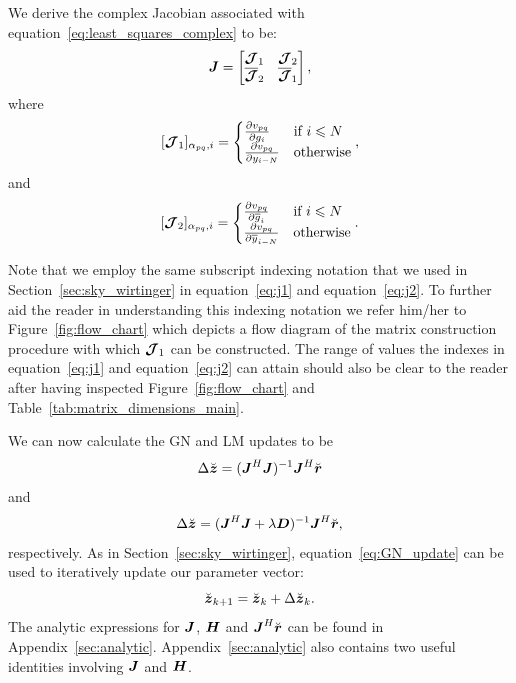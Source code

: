 \documentclass[useAMS,usenatbib]{mn2e}
\newcommand{\bz}{\bmath{z}}
\newcommand{\br}{\bmath{r}}
\newcommand{\bv}{\bmath{v}}
\newcommand{\bJ}{\bmath{J}}
\newcommand{\bD}{\bmath{D}}
\newcommand{\bH}{\bmath{H}}
\newcommand{\bmJ}{\bmath{\mathcal{J}}}
\newcommand{\conj}[1]{\overline{#1}}
\begin{document}
We derive the complex Jacobian associated with equation~\ref{eq:least_squares_complex} to be:
\begin{equation}
\label{eq:Jacobian}
\bJ = \begin{bmatrix}
       \bmJ_1 & \bmJ_2\\
       \conj{\bmJ}_2 & \conj{\bmJ}_1 
      \end{bmatrix},
\end{equation}
where 
\begin{equation}
\label{eq:j1}
[\bmJ_1]_{\alpha_{pq},i} = \begin{cases} 
     \frac{\partial v_{pq}}{\partial g_i} & \textrm{if}~i\leq N \\
     \frac{\partial v_{pq}}{\partial y_{i-N}} & \textrm{otherwise}  
\end{cases}, %
\end{equation}
and
\begin{equation}
\label{eq:j2}
[\bmJ_2]_{\alpha_{pq},i} = \begin{cases} 
     \frac{\partial v_{pq}}{\partial \conj{g}_i} & \textrm{if}~i\leq N \\
     \frac{\partial v_{pq}}{\partial \conj{y}_{i-N}} & \textrm{otherwise}  
\end{cases}. %
\end{equation}

Note that we employ the same subscript indexing notation that we used in Section~\ref{sec:sky_wirtinger} in equation~\ref{eq:j1} and equation~\ref{eq:j2}.
To further aid the reader in understanding this indexing notation we refer him/her to Figure~\ref{fig:flow_chart} which depicts a flow diagram of the matrix construction procedure 
with which $\bmJ_1$ can be constructed. The range of values the indexes in equation~\ref{eq:j1} and equation~\ref{eq:j2} can attain should also 
be clear to the reader after having inspected Figure~\ref{fig:flow_chart} and Table~\ref{tab:matrix_dimensions_main}. 

We can now calculate the GN and LM updates to be 
\begin{equation}
\label{eq:GN_update}
\Delta \breve{\bz} = (\bJ^H\bJ)^{-1}\bJ^H\breve{\br}
\end{equation}
and 
\begin{equation}
\label{eq:LM_update}
\Delta \breve{\bz} = (\bJ^H\bJ + \lambda\bD)^{-1}\bJ^H\breve{\br},
\end{equation}
respectively. As in Section~\ref{sec:sky_wirtinger}, equation~\ref{eq:GN_update} can be used to iteratively update our parameter vector:
\begin{equation}
\label{eq:update}
\breve{\bz}_{k+1} = \breve{\bz}_{k} + \Delta \breve{\bz}_{k}. 
\end{equation}
The analytic expressions for $\bJ$, $\bH$ and $\bJ^H\breve{\br}$ can be found in Appendix~\ref{sec:analytic}.
Appendix~\ref{sec:analytic} also contains two useful identities involving $\bJ$ and $\bH$. 
\end{document}

